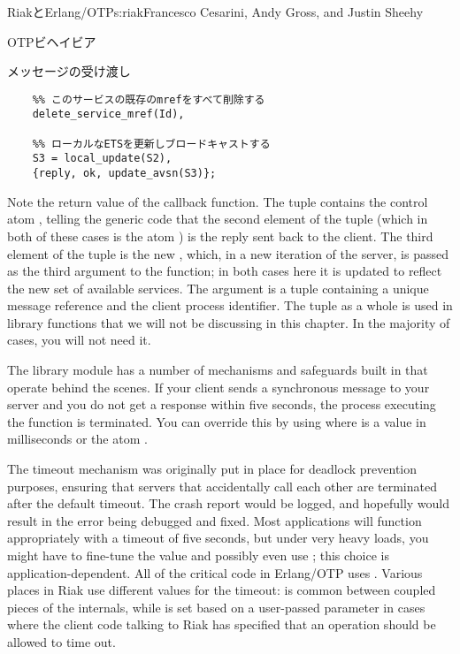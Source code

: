 \begin{aosachapter}{RiakとErlang/OTP}{s:riak}{Francesco Cesarini, Andy Gross, and Justin Sheehy}
\begin{aosasect1}{OTPビヘイビア}
\begin{aosasect2}{メッセージの受け渡し}
\begin{verbatim}
    %% このサービスの既存のmrefをすべて削除する
    delete_service_mref(Id),

    %% ローカルなETSを更新しブロードキャストする
    S3 = local_update(S2),
    {reply, ok, update_avsn(S3)};
\end{verbatim}

\noindent Note the return value of the callback function. The tuple contains the
control atom , telling the  generic code
that the second element of the tuple (which in both of these cases is
the atom ) is the reply sent back to the client. The third
element of the tuple is the new , which, in a new
iteration of the server, is passed as the third argument to the
 function; in both cases here it is updated to
reflect the new set of available services. The argument 
is a tuple containing a unique message reference and the client
process identifier. The tuple as a whole is used in library functions
that we will not be discussing in this chapter. In the majority of
cases, you will not need it.

The  library module has a number of mechanisms and
safeguards built in that operate behind the scenes. If your client
sends a synchronous message to your server and you do not get a
response within five seconds, the process executing the 
function is terminated. You can override this by using
 where 
is a value in milliseconds or the atom .

The timeout mechanism was originally put in place for deadlock
prevention purposes, ensuring that servers that accidentally call each
other are terminated after the default timeout. The crash report would
be logged, and hopefully would result in the error being debugged and
fixed. Most applications will function appropriately with a timeout of
five seconds, but under very heavy loads, you might have to fine-tune
the value and possibly even use ; this choice is
application-dependent. All of the critical code in Erlang/OTP uses
.  Various places in Riak use different values for the
timeout:  is common between coupled pieces of the
internals, while  is set based on a user-passed
parameter in cases where the client code talking to Riak has specified
that an operation should be allowed to time out.


\end{aosasect2}
\end{aosasect1}
\end{aosachapter}
